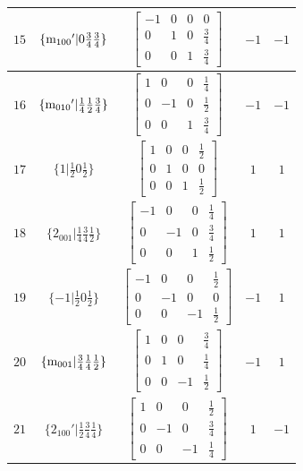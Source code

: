 \documentclass[fleqn,8pt]{jsarticle}
\begin{document}
\begin{longtable}{ccccc}
$ 15 $ & $ \{{\rm m}_{100}{}'|0 \frac{3}{4} \frac{3}{4}\} $ & $ \begin{bmatrix} -1 & 0 & 0 & 0 \\ 0 & 1 & 0 & \frac{3}{4} \\ 0 & 0 & 1 & \frac{3}{4} \end{bmatrix} $ & $ -1 $ & $ -1 $ \\ \hline
$ 16 $ & $ \{{\rm m}_{010}{}'|\frac{1}{4} \frac{1}{2} \frac{3}{4}\} $ & $ \begin{bmatrix} 1 & 0 & 0 & \frac{1}{4} \\ 0 & -1 & 0 & \frac{1}{2} \\ 0 & 0 & 1 & \frac{3}{4} \end{bmatrix} $ & $ -1 $ & $ -1 $ \\ \hline
$ 17 $ & $ \{1|\frac{1}{2} 0 \frac{1}{2}\} $ & $ \begin{bmatrix} 1 & 0 & 0 & \frac{1}{2} \\ 0 & 1 & 0 & 0 \\ 0 & 0 & 1 & \frac{1}{2} \end{bmatrix} $ & $ 1 $ & $ 1 $ \\ \hline
$ 18 $ & $ \{2{}_{001}|\frac{1}{4} \frac{3}{4} \frac{1}{2}\} $ & $ \begin{bmatrix} -1 & 0 & 0 & \frac{1}{4} \\ 0 & -1 & 0 & \frac{3}{4} \\ 0 & 0 & 1 & \frac{1}{2} \end{bmatrix} $ & $ 1 $ & $ 1 $ \\ \hline
$ 19 $ & $ \{-1|\frac{1}{2} 0 \frac{1}{2}\} $ & $ \begin{bmatrix} -1 & 0 & 0 & \frac{1}{2} \\ 0 & -1 & 0 & 0 \\ 0 & 0 & -1 & \frac{1}{2} \end{bmatrix} $ & $ -1 $ & $ 1 $ \\ \hline
$ 20 $ & $ \{{\rm m}_{001}|\frac{3}{4} \frac{1}{4} \frac{1}{2}\} $ & $ \begin{bmatrix} 1 & 0 & 0 & \frac{3}{4} \\ 0 & 1 & 0 & \frac{1}{4} \\ 0 & 0 & -1 & \frac{1}{2} \end{bmatrix} $ & $ -1 $ & $ 1 $ \\ \hline
$ 21 $ & $ \{2{}_{100}{}'|\frac{1}{2} \frac{3}{4} \frac{1}{4}\} $ & $ \begin{bmatrix} 1 & 0 & 0 & \frac{1}{2} \\ 0 & -1 & 0 & \frac{3}{4} \\ 0 & 0 & -1 & \frac{1}{4} \end{bmatrix} $ & $ 1 $ & $ -1 $ \\ \hline

\end{longtable}
\end{document}
